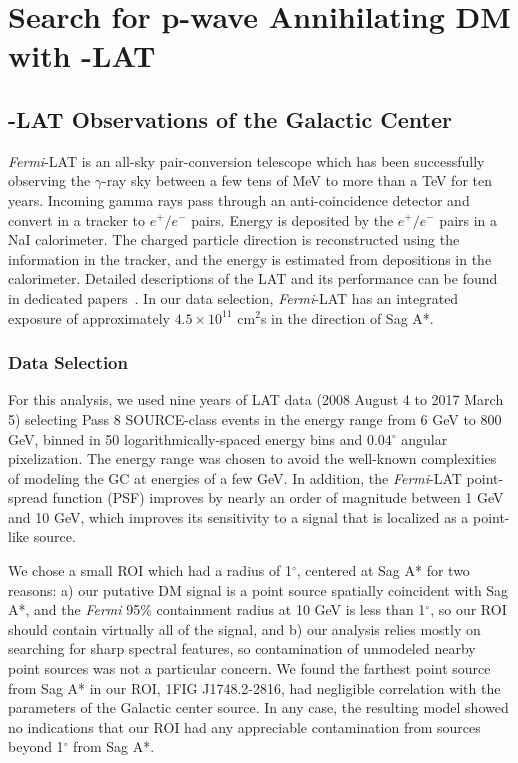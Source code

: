 \chapter{Search for p-wave Annihilating DM with \Fermi-LAT}
\section{\Fermi-LAT Observations of the Galactic Center}\label{sec:GC}

{\it Fermi}-LAT is an all-sky pair-conversion telescope which has been successfully observing the $\gamma$-ray sky between a few tens of MeV to more than a TeV for ten years.
Incoming gamma rays pass through an anti-coincidence detector and convert in a tracker to $e^{+}/e^{-}$ pairs. 
Energy is deposited by the $e^{+}/e^{-}$ pairs in a NaI calorimeter.
The charged particle direction is reconstructed using the information in the tracker, and the energy is estimated from depositions in the calorimeter.  
Detailed descriptions of the LAT and its performance can be found in dedicated papers~\cite{Atwood:2009ez,2013arXiv1303.3514A}. 
In our data selection, {\it Fermi}-LAT has an integrated exposure of approximately $4.5 \times 10^{11}$ cm$^2$s in the direction of Sag A*.

\subsection{Data Selection}\label{sec:fermi}

For this analysis, we used nine years of LAT data (2008 August 4 to 2017 March 5) selecting {Pass 8} SOURCE-class events 
in the energy range from 6 GeV to 800 GeV, binned in 50 logarithmically-spaced energy bins and 0.04$^\circ$ angular pixelization. 
The energy range was chosen to avoid the well-known \cite[e.g.][]{GC2016} complexities of modeling the GC at energies of a few GeV. In addition,
the {\it Fermi}-LAT point-spread function (PSF) improves by nearly an order of magnitude between 1 GeV and 10 GeV, which improves its sensitivity to a signal that is localized as a point-like source.

We chose a small ROI which had a radius of 1$^\circ$, centered at Sag A* for two reasons: a) our putative DM signal is a point source spatially coincident with Sag A*, and the {\it Fermi} 95\% containment radius at 10 GeV is less than 1$^\circ$, so our ROI should contain virtually all of the signal, and b) our analysis relies mostly on searching for sharp spectral features, so contamination of unmodeled nearby point sources was not a particular concern.
We found the farthest point source from Sag A* in our ROI, 1FIG J1748.2-2816, had negligible correlation with the parameters of the Galactic center source.
In any case, the resulting model showed no indications that our ROI had any appreciable contamination from sources beyond 1$^\circ$ from Sag A*.

